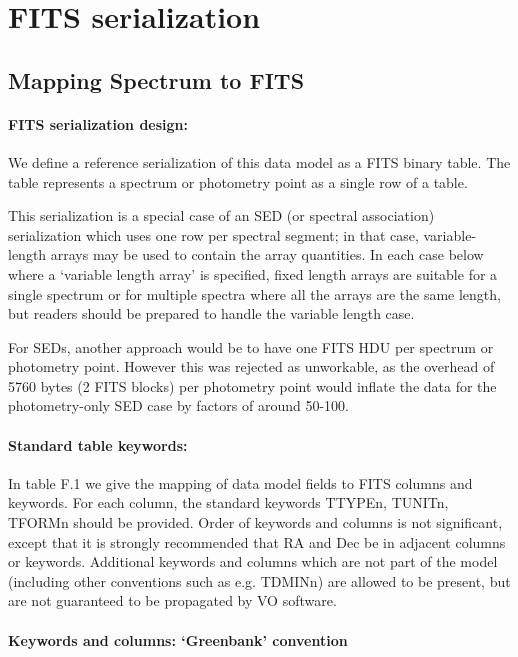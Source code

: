 

\section{FITS serialization}


\subsection{Mapping Spectrum to FITS}


\paragraph {\bf FITS serialization design:}
We define a reference serialization of this data model as a FITS binary table.
The table represents a spectrum or photometry point as a single row of a table.

This serialization is a special case of an SED (or spectral association)
serialization which
uses one row per spectral segment; in that case,
variable-length arrays may be used to contain the array quantities.
In each case below where a `variable length array' is specified, fixed length
arrays are suitable for a single spectrum or for multiple spectra where
all the arrays are the same length, but readers should be
prepared to handle the variable length case. 


For SEDs, another approach would be to have one FITS HDU per spectrum or
photometry point. However this was rejected as unworkable, as the
overhead of 5760 bytes (2 FITS blocks) per photometry point would
inflate the data for the photometry-only SED case by factors of around
50-100.

\paragraph {\bf Standard table keywords:}
In table F.1 we give the mapping of data model fields to FITS columns and keywords.
For each column, the standard keywords TTYPEn, TUNITn, TFORMn should
be provided. Order of keywords and columns is not significant,
except that it is strongly recommended that RA and Dec be in adjacent columns
or keywords. Additional keywords and columns which are not part of the
model (including other conventions such as e.g. TDMINn)  are allowed 
to be present, but are not guaranteed to be propagated by VO software.

\paragraph {\bf Keywords and columns: `Greenbank' convention}

